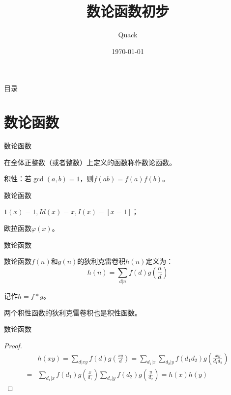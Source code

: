 \documentclass{ctexbeamer}        %
\begin{document}
%
\title{数论函数初步}
\author{Quack}
\date{\today}
\frame{\titlepage}

\begin{frame}{目录}         %
  \tableofcontents[hideallsubsections]
\end{frame}

\section{数论函数}

\begin{frame}{数论函数}

\begin{definition}[数论函数]
    在全体正整数（或者整数）上定义的函数称作数论函数。
\end{definition}

\begin{definition}[积性]
    积性：若$\gcd(a,b)=1$，则$f(ab)=f(a)f(b)$。
\end{definition}

\end{frame}


\begin{frame}{数论函数}

\begin{example}[积性数论函数]
    $1(x)=1,Id(x)=x,I(x)=[x=1]$；

    欧拉函数$\varphi(x)$。
\end{example}

\end{frame}

\begin{frame}{数论函数}

\begin{definition}[狄利克雷卷积]
    数论函数$f(n)$和$g(n)$的狄利克雷卷积$h(n)$定义为：
    $$h(n)=\sum_{d|n}f(d)g(\frac{n}{d})$$

    记作$h=f \ast g$。
\end{definition}

\begin{theorem}
    两个积性函数的狄利克雷卷积也是积性函数。
\end{theorem}

\end{frame}

\begin{frame}{数论函数}

\begin{proof}
    \begin{align*}
        &h(xy)=\sum_{d|xy} f(d)g(\frac{xy}{d})=\sum_{d_1|x}\sum_{d_2|y} f(d_1d_2)g(\frac{xy}{d_1d_2})\\
        =&\sum_{d_1|x}f(d_1)g(\frac{x}{d_1})\sum_{d_2|y} f(d_2)g(\frac{y}{d_2})=h(x)h(y)
    \end{align*}
\end{proof}

\end{frame}
\end{document}
